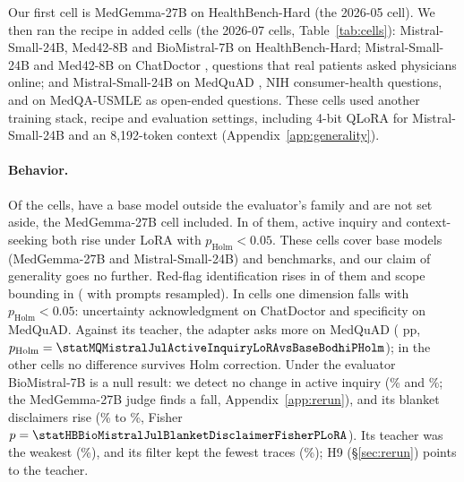 \documentclass{article}
\newcommand{\hbhard}{HealthBench-Hard}
\begin{document}
Our first cell is MedGemma-27B on \hbhard{} (the 2026-05 cell). We then ran the recipe in
\statGroupAddedCells{} added cells (the 2026-07 cells, Table~\ref{tab:cells}): Mistral-Small-24B, Med42-8B
and BioMistral-7B \citep{labrak2024biomistral} on \hbhard{}; Mistral-Small-24B and Med42-8B on
ChatDoctor \citep{li2023chatdoctor}, questions that real patients asked physicians online; and
Mistral-Small-24B on MedQuAD \citep{benabacha2019medquad}, NIH consumer-health questions, and on
MedQA-USMLE as open-ended questions. These cells used another training stack, recipe and evaluation
settings, including 4-bit QLoRA for Mistral-Small-24B and an 8,192-token context
(Appendix~\ref{app:generality}).

\paragraph{Behavior.} Of the \statCrossCells{} cells, \statGroupOutsideFamilyCells{} have a base model
outside the evaluator's family and are not set aside, the MedGemma-27B cell included. In
\statGroupOutsideFamilyAskRose{} of them, active inquiry and context-seeking both rise under LoRA with
$p_{\text{Holm}} < 0.05$. These cells cover \statGroupOutsideFamilyAskRoseModels{} base models
(MedGemma-27B and Mistral-Small-24B) and \statGroupOutsideFamilyAskRoseBenchmarks{} benchmarks, and our
claim of generality goes no further. Red-flag identification rises in
\statGroupOutsideFamilyRedFlagRose{} of them and scope bounding in \statGroupOutsideFamilyScopeRose{}
(\statGroupOutsideFamilyScopeRoseBoot{} with prompts resampled). In \statGroupOutsideFamilyDimFell{} cells
one dimension falls with $p_{\text{Holm}} < 0.05$: uncertainty acknowledgment on ChatDoctor and
specificity on MedQuAD. Against its teacher, the adapter asks more on MedQuAD
(\statMQMistralJulActiveInquiryLoRAvsBaseBodhiDiff{} pp, $p_{\text{Holm}} =
\statMQMistralJulActiveInquiryLoRAvsBaseBodhiPHolm$); in the other cells no difference survives Holm
correction. Under the evaluator BioMistral-7B is a null result: we detect no change in active inquiry
(\statHBBioMistralJulActiveInquiryBase\% and \statHBBioMistralJulActiveInquiryLoRA\%; the MedGemma-27B
judge finds a fall, Appendix~\ref{app:rerun}), and its blanket disclaimers rise
(\statHBBioMistralJulBlanketDisclaimerPctBase\% to \statHBBioMistralJulBlanketDisclaimerPctLoRA\%, Fisher
$p = \statHBBioMistralJulBlanketDisclaimerFisherPLoRA$). Its teacher was the weakest
(\statHBBioMistralJulActiveInquiryBaseBodhi\%), and its filter kept the fewest traces
(\statHBBioMistralJulFilterKeptPct\%); H9 (\S\ref{sec:rerun}) points to the teacher.
\end{document}
